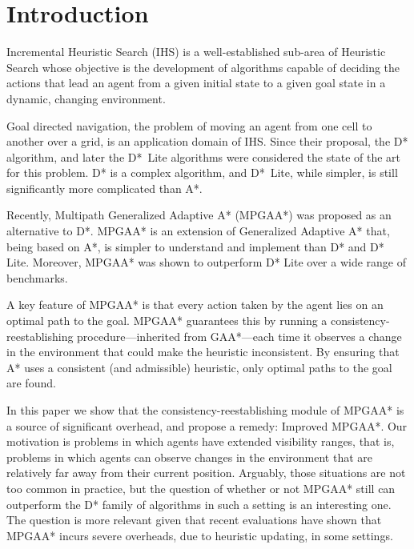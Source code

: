 \documentclass{article}
\begin{document}
\section{Introduction}
Incremental Heuristic Search (IHS) is a well-established sub-area of Heuristic Search whose objective is the development of algorithms capable of deciding the actions that lead an agent from a given initial state to a given goal state in a dynamic, changing environment.

Goal directed navigation, the problem of moving an agent from one cell to another over a grid, is an application domain of IHS. Since their proposal, the D* \cite{Stentz94} algorithm, and later the D*~Lite \cite{KoenigLikhachev02} algorithms were considered the state of the art for this problem.  D* is a complex algorithm, and D*~Lite, while simpler, is still significantly more complicated than A*. 

Recently, Multipath Generalized Adaptive A* (MPGAA*) \cite{HernandezAB15} was proposed as an alternative to D*. MPGAA* is an extension of Generalized Adaptive A* \cite{SunKY08} that, being based on A*, is simpler to understand and implement than D* and D* Lite. Moreover, MPGAA* was shown to outperform D* Lite over a wide range of benchmarks.

A key feature of MPGAA* is that every action taken by the agent lies on an optimal path to the goal. MPGAA* guarantees this by running a consistency-reestablishing procedure---inherited from GAA*---each time it observes a change in the environment that could make the heuristic inconsistent. By ensuring that A* uses a consistent (and admissible) heuristic, only optimal paths to the goal are found.

In this paper we show that the consistency-reestablishing module of MPGAA* is a source of significant overhead, and propose a remedy: Improved MPGAA*. Our motivation is problems in which agents have extended visibility ranges, that is, problems in which agents can observe changes in the environment that are relatively far away from their current position. Arguably, those situations are not too common in practice, but  the question of whether or not MPGAA* still can outperform the D* family of algorithms in such a setting is an interesting one. The question is more relevant given that recent evaluations \cite{AineL16} have shown that MPGAA* incurs severe overheads, due to heuristic updating, in some settings.
\end{document}
